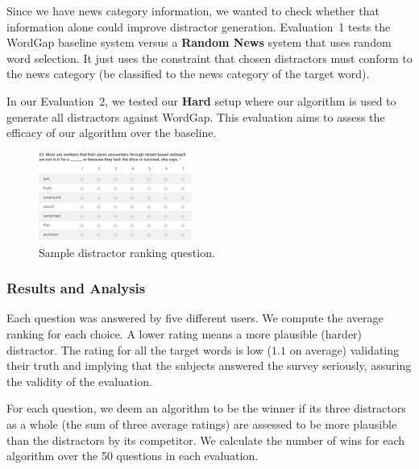 Since we have news category information, we wanted to check whether
that information alone could improve distractor generation.
Evaluation~1 tests the WordGap baseline system versus a {\bf Random News}
system that uses random word selection.  It just uses the constraint
that chosen distractors must conform to the news category (be
classified to the news category of the target word).

In our Evaluation~2, we tested our {\bf Hard} setup where our
algorithm is used to generate all distractors against WordGap.  This
evaluation aims to assess the efficacy of our algorithm over the
baseline.



\begin{figure}[th]
   \centering
   \includegraphics[width=0.45\textwidth]{distractor_new.png}
   \caption{Sample distractor ranking question.}
   \label{fig:distractor_1}
\end{figure}



\subsubsection{Results and Analysis}

Each question was answered by five different users.  We compute the
average ranking for each choice. A lower rating means a more plausible
(harder) distractor.  The rating for all the target words is low
($1.1$ on average) validating their truth and implying that the
subjects answered the survey seriously, assuring the validity of the
evaluation.

For each question, we deem an algorithm to be the winner if its three
distractors as a whole (the sum of three average ratings) are assessed
to be more plausible than the distractors by its competitor. We
calculate the number of wins for each algorithm over the 50 questions
in each evaluation. 


